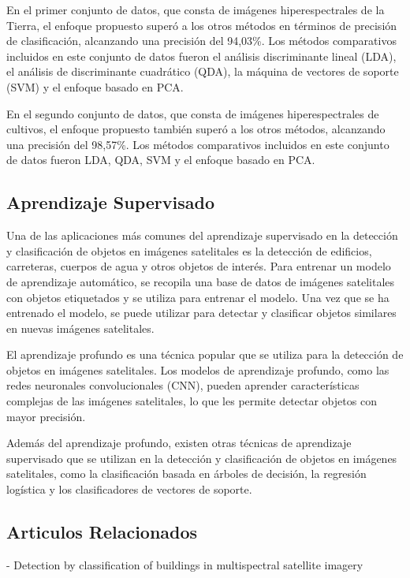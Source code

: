 \documentclass[article]{llncs}
\begin{document}
  En el primer conjunto de datos, que consta de imágenes hiperespectrales de la Tierra, el enfoque propuesto superó a 
  los otros métodos en términos de precisión de clasificación, alcanzando una precisión del 94,03\%. Los métodos 
  comparativos incluidos en este conjunto de datos fueron el análisis discriminante lineal (LDA), el análisis de 
  discriminante cuadrático (QDA), la máquina de vectores de soporte (SVM) y el enfoque basado en PCA.

  En el segundo conjunto de datos, que consta de imágenes hiperespectrales de cultivos, el enfoque propuesto también 
  superó a los otros métodos, alcanzando una precisión del 98,57\%. Los métodos comparativos incluidos en este conjunto 
  de datos fueron LDA, QDA, SVM y el enfoque basado en PCA.


\subsection{Aprendizaje Supervisado}

Una de las aplicaciones más comunes del aprendizaje supervisado en la detección y clasificación de objetos en imágenes 
satelitales es la detección de edificios, carreteras, cuerpos de agua y otros objetos de interés. Para entrenar un 
modelo de aprendizaje automático, se recopila una base de datos de imágenes satelitales con objetos etiquetados y se 
utiliza para entrenar el modelo. Una vez que se ha entrenado el modelo, se puede utilizar para detectar y clasificar 
objetos similares en nuevas imágenes satelitales.

El aprendizaje profundo es una técnica popular que se utiliza para la detección de objetos en 
imágenes satelitales. Los modelos de aprendizaje profundo, como las redes neuronales convolucionales (CNN), pueden 
aprender características complejas de las imágenes satelitales, lo que les permite detectar objetos con mayor precisión.

Además del aprendizaje profundo, existen otras técnicas de aprendizaje supervisado que se utilizan en la detección y 
clasificación de objetos en imágenes satelitales, como la clasificación basada en árboles de decisión, la regresión 
logística y los clasificadores de vectores de soporte.

\subsection{Articulos Relacionados}

- Detection by classification of buildings in multispectral satellite imagery
\end{document}
